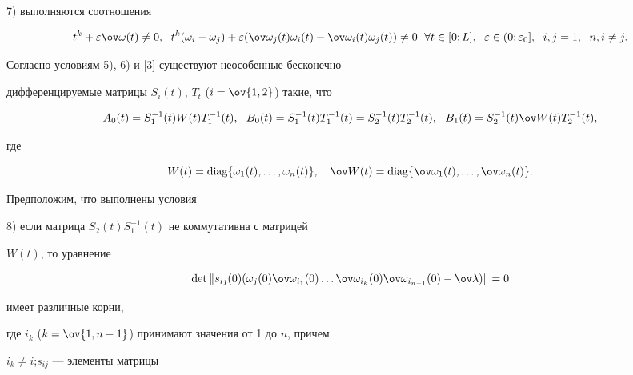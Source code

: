  


7) выполняются соотношения 


$$ 


t^k+\varepsilon\ov\omega(t)\ne0,\ \; t^k(\omega_i-\omega_j)+ 


\varepsilon(\ov\omega_j(t)\omega_i(t)-\ov\omega_i(t) 


\omega_j(t))\ne0\ \; \forall t\in[0;L], 


\ \; \varepsilon\in(0;\varepsilon_0], 


\ \; i,j=1,\ \; n,i\ne j. 


$$ 


 


Согласно условиям 5), 6) и [3] существуют неособенные бесконечно 


дифференцируемые матрицы $S_i(t)$, $T_t$ ($i=\ov{1,2}$) такие, что 


$$ 


A_0(t)=S^{-1}_1(t)W(t)T^{-1}_1(t), 


\ \ B_0(t)=S^{-1}_1(t)T^{-1}_1(t)= 


S^{-1}_2(t)T^{-1}_2(t), 


\ \ B_1(t)=S^{-1}_2(t)\ov W(t)T^{-1}_2(t), 


$$ 


где 


$$ 


W(t)=\diag\{\omega_1(t),\dotsc,\omega_n(t)\},\quad 


\ov W(t)=\diag\{\ov\omega_1(t),\dotsc,\ov\omega_n(t)\}. 


$$ 


Предположим, что выполнены условия 


 


8) если матрица $S_2(t)S^{-1}_1(t)$ не коммутативна с матрицей 


$W(t)$, то уравнение


$$


\det\|s_{ij}(0)(\omega_j(0) \ov 


\omega_{i_1}(0)\dotsc \ov\omega_{i_k}(0) 


\ov\omega_{i_{n-1}}(0)-\ov\lambda)\|=0


$$


имеет различные корни, 


где $i_k$ ($k=\ov{1,n-1}$) принимают значения от 1 до $n$, причем 


$i_k\ne i$;\linebreak $s_{ij}$ --- элементы матрицы 


